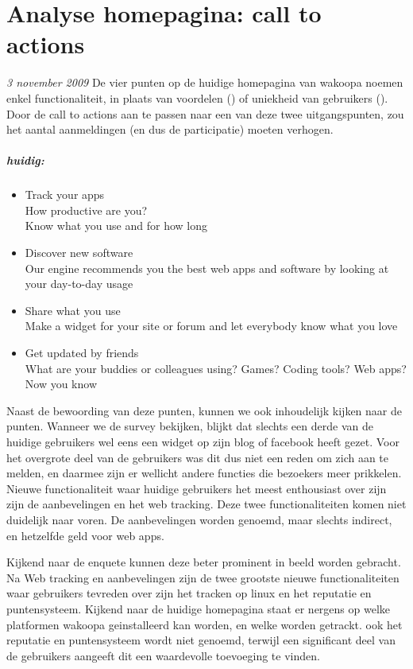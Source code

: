 \chapter{Analyse homepagina: call to actions}
\textit{3 november 2009} De vier punten op de huidige homepagina van wakoopa noemen enkel functionaliteit, in plaats van voordelen (\citet{Hoekman2008}) of uniekheid van gebruikers (\citet{Beenen2004}). Door de call to actions aan te passen naar een van deze twee uitgangspunten, zou het aantal aanmeldingen (en dus de participatie) moeten verhogen.

\paragraph{huidig:}
\begin{itemize}
    \item{Track your apps\\
      How productive are you?\\
      Know what you use and for how long}

    \item{Discover new software\\
      Our engine recommends you the best web apps and software by looking at your day-to-day usage}

    \item{Share what you use\\
      Make a widget for your site or forum and let everybody know what you love}

    \item{Get updated by friends\\
      What are your buddies or colleagues using? Games? Coding tools? Web apps? Now you know}
\end{itemize}

Naast de bewoording van deze punten, kunnen we ook inhoudelijk kijken naar de punten. Wanneer we de survey bekijken, blijkt dat slechts een derde van de huidige gebruikers wel eens een widget op zijn blog of facebook heeft gezet. Voor het overgrote deel van de gebruikers was dit dus niet een reden om zich aan te melden, en daarmee zijn er wellicht andere functies die bezoekers meer prikkelen. Nieuwe functionaliteit waar huidige gebruikers het meest enthousiast over zijn zijn de aanbevelingen en het web tracking. Deze twee functionaliteiten komen niet duidelijk naar voren. De aanbevelingen worden genoemd, maar slechts indirect, en hetzelfde geld voor web apps.

Kijkend naar de enquete kunnen deze beter prominent in beeld worden gebracht. Na Web tracking en aanbevelingen zijn de twee grootste nieuwe functionaliteiten waar gebruikers tevreden over zijn het tracken op linux en het reputatie en puntensysteem. Kijkend naar de huidige homepagina staat er nergens op welke platformen wakoopa geinstalleerd kan worden, en welke worden getrackt. ook het reputatie en puntensysteem wordt niet genoemd, terwijl een significant deel van de gebruikers aangeeft dit een waardevolle toevoeging te vinden.

